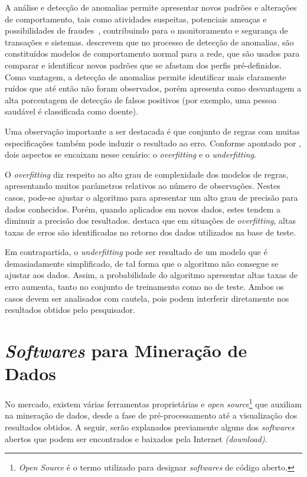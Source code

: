 A análise e detecção de anomalias permite apresentar novos padrões e alterações de comportamento, tais como atividades suspeitas, potenciais ameaças e possibilidades de fraudes~\citep{witten2005}, contribuindo para o monitoramento e segurança de transações e sistemas. \citet{han_kamber2006} descrevem que no processo de detecção de anomalias, são constituídos modelos de comportamento normal para a rede, que são usados para comparar e identificar novos padrões que se afastam dos perfis pré-definidos. Como vantagem, a detecção de anomalias permite identificar mais claramente ruídos que até então não foram observados, porém apresenta como desvantagem a alta porcentagem de detecção de falsos positivos (por exemplo, uma pessoa saudável é classificada como doente). 

Uma observação importante a ser destacada é que conjunto de regras com muitas especificações também pode induzir o resultado ao erro. Conforme apontado por \citet{miranda2012}, dois aspectos se encaixam nesse cenário: o \textit{overfitting} e o \textit{underfitting}. 

O \textit{overfitting} diz respeito ao alto grau de complexidade dos modelos de regras, apresentando muitos parâmetros relativos ao número de observações. Nestes casos, pode-se ajustar o algoritmo para apresentar um alto grau de precisão para dados conhecidos. Porém, quando aplicados em novos dados, estes tendem a diminuir a precisão dos resultados. \citet{miranda2012} destaca que em situações de \textit{overfitting}, altas taxas de erros são identificadas no retorno dos dados utilizados na base de teste. 

Em contrapartida, o \textit{underfitting} pode ser resultado de um modelo que é demasiadamente simplificado, de tal forma que o algoritmo não consegue se ajustar aos dados. Assim, a probabilidade do algoritmo apresentar altas taxas de erro aumenta, tanto no conjunto de treinamento como no de teste. Ambos os casos devem ser analisados com cautela, pois podem interferir diretamente nos resultados obtidos pelo pesquisador.

\section{\textit{Softwares} para Mineração de Dados} \label{3title4}

No mercado, existem várias ferramentas proprietárias e \textit{open source}\footnote{\textit{Open Source} é o termo utilizado para designar \textit{softwares} de código aberto.}  que auxiliam na mineração de dados, desde a fase de pré-processamento até a visualização dos resultados obtidos. A seguir, serão explanados previamente alguns dos \textit{softwares} abertos que podem ser encontrados e baixados pela Internet \textit{(download)}.

